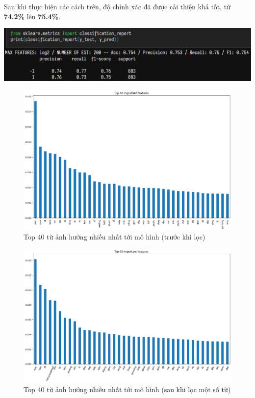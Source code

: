 Sau khi thực hiện các cách trên, độ chính xác đã được cải thiện khá tốt, từ \textbf{74.2\%} lên \textbf{75.4\%}.

\begin{center}
\includegraphics[width=1\textwidth]{images/code-5.15-rftestaft.png}
\end{center}

\begin{figure}[H]
    \centering
    \vspace{-2em}
    \includegraphics[width=1\linewidth]{images/plot-5.7-prefiltersw.png}
    \vspace{-2em}
    \caption{Top 40 từ ảnh hưởng nhiều nhất tới mô hình (trước khi lọc)}
    \label{fig:5.12}
\end{figure}
\vspace{-1.5em}
\begin{figure}[H]
    \centering
    \includegraphics[width=1\linewidth]{images/plot-5.10-40featureslist.png}
    \vspace{-2.5em}
    \caption{Top 40 từ ảnh hưởng nhiều nhất tới mô hình (sau khi lọc một số từ)}
    \label{fig:5.13}
\end{figure}
\vspace{-2em}

